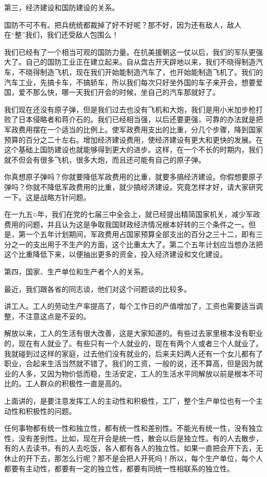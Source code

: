 第三，经济建设和国防建设的关系。

国防不可不有。把兵统统都裁掉了好不好呢？那不好，因为还有敌人，敌人在“整”我们，我们还受敌人包围么！

我们已经有了一个相当可观的国防力量。在抗美援朝这一仗以后，我们的军队更强大了。自己的国防工业正在建立起来。自从盘古开天辟地以来，我们不晓得制造汽车，不晓得制造飞机，现在我们开始能制造汽车了，也开始能制造飞机了。我们的汽车工业，先搞卡车，不搞轿车，所以我们每次只好坐外国的车子来开会，想要爱国，爱不那么快，哪一天我们开会的时候，坐自己的汽车那就好了。

我们现在还没有原子弹，但是我们过去也没有飞机和大炮，我们是用小米加步枪打败了日本侵略者和蒋介石的。我们已经相当强，以后还要更强，可靠的办法就是把军政费用摆在一个适当的比例上。使军政费用支出的比重，分几个步骤，降到国家预算的百分之二十左右。增加经济建设费用，使经济建设有更大和更快的发展。在这个基础上国防建设也就能够得到更大的进步。这样，在一个不长的时期内，我们就不但会有很多飞机，很多大炮，而且还可能有自己的原子弹。

你真想原子弹吗？你就要降低军政费用的比重，就要多搞经济建设。你假想要原子弹吗？你就不降低军政费用的比重，就少搞经济建设。究竟怎样才好，请大家研究一下。这是战略方针问题。

在一九五○年，我们在党的七届三中全会上，就已经提出精简国家机关，减少军政费用的问题，并且认为这是争取我国财政经济情况根本好转的三个条件之一。但是，第一个五年计划期间，军政费用占国家预算全部支出的百分之三十二，即有三分之一的支出用于不生产的方面，这个比重太大了。第二个五年计划应当想办法把这个比重降低下来，以便抽出更多的资金，投入经济建设和文化建设。

第四，国家、生产单位和生产者个人的关系。

最近，我们跟各省的同志谈，他们对这个问题谈的比较多。

讲工人。工人的劳动生产率提高了，每个工作日的产值增加了，工资也需要适当调整，不注意这点是不妥的。

解放以来，工人的生活有很大改善，这是大家知道的。有些过去家里根本没有职业的，现在有人就业了。有些只有一个人就业的，现在有两个人或者三个人就业了。我就碰到过这样的家庭，过去他们没有就业的，后来夫妇两人还有一个女儿都有了职业，合起来生活当然就不错了。我们的工资，一般的说，还不算高，但是因为就业的人多，又因为物价低而稳，生活安定，工人的生活水平同解放以前是根本不可比的。工人群众的积极性一直是高的。

上面讲的，是要注意发挥工人的主动性和积极性，工厂，整个生产单位也有一个主动性和积极性的问题。

任何事物都有统一性和独立性，都有统一性和差别性。不能光有统一性，没有独立性，没有差别性。比如，现在开会是统一性，散会以后是独立性。有的人去散步，有的人去读书，有的人去吃饭，各人都有各人的独立性。如果一直把会开下去，无休止的开下去，那怎么行呢？那不是会把人开死吗！所以，每个生产单位，每个人都要有主动性，都要有一定的独立性，都要有同统一性相联系的独立性。

